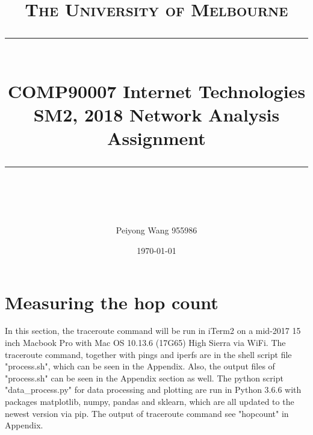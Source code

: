 \documentclass[paper=a4, fontsize=10pt]{scrartcl} %
\numberwithin{equation}{section} %
\numberwithin{figure}{section} %
\numberwithin{table}{section} %
\newcommand{\horrule}[1]{\rule{\linewidth}{#1}} %
\begin{document}
\restoregeometry %
\nopagecolor%
%

\title{	
\normalfont \normalsize 
\textsc{The University of Melbourne } \\ [25pt] %
\horrule{0.5pt} \\[0.4cm] %
\huge COMP90007 Internet Technologies SM2, 2018
Network Analysis Assignment \\ %
\horrule{2pt} \\[0.5cm] %
}

\author{Peiyong Wang   955986} %

\date{\normalsize\today} %

\maketitle
{} %

\section{Measuring the hop count}
In this section, the traceroute command will be run in iTerm2 on a mid-2017 15 inch Macbook Pro with Mac OS 10.13.6 (17G65) High Sierra via WiFi. The traceroute command, together with pings and iperfs are in the shell script file "process.sh", which can be seen in the Appendix. Also, the output files of "process.sh" can be seen in the Appendix section as well. The python script "data\_process.py" for data processing and plotting are run in Python 3.6.6 with packages matplotlib\cite{hunter2007matplotlib}, numpy\cite{Oliphant:2007:PSC:1251563.1251830}, pandas\cite{mckinneypandas,  mckinney-proc-scipy-2010} and sklearn\cite{sklearn_api}, which are all updated to the newest version via pip.   The output of traceroute command see "hopcount" in Appendix.
\end{document}
